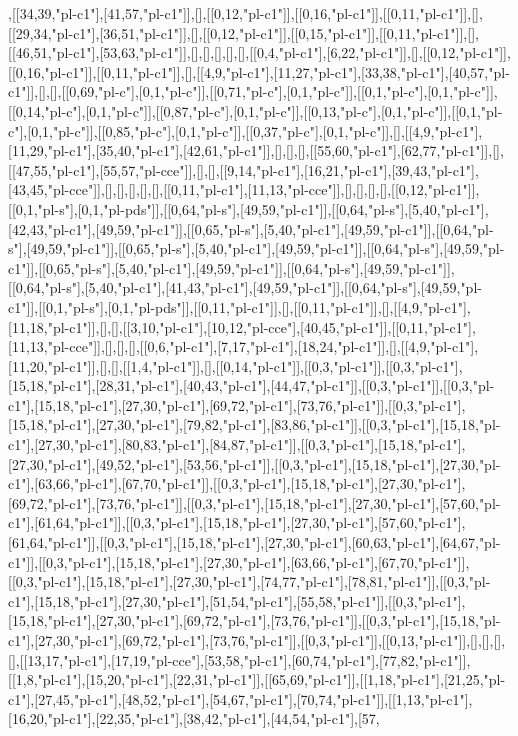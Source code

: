 ,[[34,39,"pl-c1"],[41,57,"pl-c1"]],[],[[0,12,"pl-c1"]],[[0,16,"pl-c1"]],[[0,11,"pl-c1"]],[],[[29,34,"pl-c1"],[36,51,"pl-c1"]],[],[[0,12,"pl-c1"]],[[0,15,"pl-c1"]],[[0,11,"pl-c1"]],[],[[46,51,"pl-c1"],[53,63,"pl-c1"]],[],[],[],[],[],[[0,4,"pl-c1"],[6,22,"pl-c1"]],[],[[0,12,"pl-c1"]],[[0,16,"pl-c1"]],[[0,11,"pl-c1"]],[],[[4,9,"pl-c1"],[11,27,"pl-c1"],[33,38,"pl-c1"],[40,57,"pl-c1"]],[],[],[[0,69,"pl-c"],[0,1,"pl-c"]],[[0,71,"pl-c"],[0,1,"pl-c"]],[[0,1,"pl-c"],[0,1,"pl-c"]],[[0,14,"pl-c"],[0,1,"pl-c"]],[[0,87,"pl-c"],[0,1,"pl-c"]],[[0,13,"pl-c"],[0,1,"pl-c"]],[[0,1,"pl-c"],[0,1,"pl-c"]],[[0,85,"pl-c"],[0,1,"pl-c"]],[[0,37,"pl-c"],[0,1,"pl-c"]],[],[[4,9,"pl-c1"],[11,29,"pl-c1"],[35,40,"pl-c1"],[42,61,"pl-c1"]],[],[],[],[[55,60,"pl-c1"],[62,77,"pl-c1"]],[],[[47,55,"pl-c1"],[55,57,"pl-cce"]],[],[],[[9,14,"pl-c1"],[16,21,"pl-c1"],[39,43,"pl-c1"],[43,45,"pl-cce"]],[],[],[],[],[],[[0,11,"pl-c1"],[11,13,"pl-cce"]],[],[],[],[],[[0,12,"pl-c1"]],[[0,1,"pl-s"],[0,1,"pl-pds"]],[[0,64,"pl-s"],[49,59,"pl-c1"]],[[0,64,"pl-s"],[5,40,"pl-c1"],[42,43,"pl-c1"],[49,59,"pl-c1"]],[[0,65,"pl-s"],[5,40,"pl-c1"],[49,59,"pl-c1"]],[[0,64,"pl-s"],[49,59,"pl-c1"]],[[0,65,"pl-s"],[5,40,"pl-c1"],[49,59,"pl-c1"]],[[0,64,"pl-s"],[49,59,"pl-c1"]],[[0,65,"pl-s"],[5,40,"pl-c1"],[49,59,"pl-c1"]],[[0,64,"pl-s"],[49,59,"pl-c1"]],[[0,64,"pl-s"],[5,40,"pl-c1"],[41,43,"pl-c1"],[49,59,"pl-c1"]],[[0,64,"pl-s"],[49,59,"pl-c1"]],[[0,1,"pl-s"],[0,1,"pl-pds"]],[[0,11,"pl-c1"]],[],[[0,11,"pl-c1"]],[],[[4,9,"pl-c1"],[11,18,"pl-c1"]],[],[],[[3,10,"pl-c1"],[10,12,"pl-cce"],[40,45,"pl-c1"]],[[0,11,"pl-c1"],[11,13,"pl-cce"]],[],[],[],[[0,6,"pl-c1"],[7,17,"pl-c1"],[18,24,"pl-c1"]],[],[[4,9,"pl-c1"],[11,20,"pl-c1"]],[],[],[[1,4,"pl-c1"]],[],[[0,14,"pl-c1"]],[[0,3,"pl-c1"]],[[0,3,"pl-c1"],[15,18,"pl-c1"],[28,31,"pl-c1"],[40,43,"pl-c1"],[44,47,"pl-c1"]],[[0,3,"pl-c1"]],[[0,3,"pl-c1"],[15,18,"pl-c1"],[27,30,"pl-c1"],[69,72,"pl-c1"],[73,76,"pl-c1"]],[[0,3,"pl-c1"],[15,18,"pl-c1"],[27,30,"pl-c1"],[79,82,"pl-c1"],[83,86,"pl-c1"]],[[0,3,"pl-c1"],[15,18,"pl-c1"],[27,30,"pl-c1"],[80,83,"pl-c1"],[84,87,"pl-c1"]],[[0,3,"pl-c1"],[15,18,"pl-c1"],[27,30,"pl-c1"],[49,52,"pl-c1"],[53,56,"pl-c1"]],[[0,3,"pl-c1"],[15,18,"pl-c1"],[27,30,"pl-c1"],[63,66,"pl-c1"],[67,70,"pl-c1"]],[[0,3,"pl-c1"],[15,18,"pl-c1"],[27,30,"pl-c1"],[69,72,"pl-c1"],[73,76,"pl-c1"]],[[0,3,"pl-c1"],[15,18,"pl-c1"],[27,30,"pl-c1"],[57,60,"pl-c1"],[61,64,"pl-c1"]],[[0,3,"pl-c1"],[15,18,"pl-c1"],[27,30,"pl-c1"],[57,60,"pl-c1"],[61,64,"pl-c1"]],[[0,3,"pl-c1"],[15,18,"pl-c1"],[27,30,"pl-c1"],[60,63,"pl-c1"],[64,67,"pl-c1"]],[[0,3,"pl-c1"],[15,18,"pl-c1"],[27,30,"pl-c1"],[63,66,"pl-c1"],[67,70,"pl-c1"]],[[0,3,"pl-c1"],[15,18,"pl-c1"],[27,30,"pl-c1"],[74,77,"pl-c1"],[78,81,"pl-c1"]],[[0,3,"pl-c1"],[15,18,"pl-c1"],[27,30,"pl-c1"],[51,54,"pl-c1"],[55,58,"pl-c1"]],[[0,3,"pl-c1"],[15,18,"pl-c1"],[27,30,"pl-c1"],[69,72,"pl-c1"],[73,76,"pl-c1"]],[[0,3,"pl-c1"],[15,18,"pl-c1"],[27,30,"pl-c1"],[69,72,"pl-c1"],[73,76,"pl-c1"]],[[0,3,"pl-c1"]],[[0,13,"pl-c1"]],[],[],[],[],[[13,17,"pl-c1"],[17,19,"pl-cce"],[53,58,"pl-c1"],[60,74,"pl-c1"],[77,82,"pl-c1"]],[[1,8,"pl-c1"],[15,20,"pl-c1"],[22,31,"pl-c1"]],[[65,69,"pl-c1"]],[[1,18,"pl-c1"],[21,25,"pl-c1"],[27,45,"pl-c1"],[48,52,"pl-c1"],[54,67,"pl-c1"],[70,74,"pl-c1"]],[[1,13,"pl-c1"],[16,20,"pl-c1"],[22,35,"pl-c1"],[38,42,"pl-c1"],[44,54,"pl-c1"],[57,